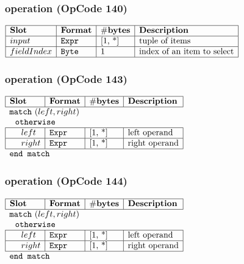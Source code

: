 \subsubsection{ operation (OpCode 140)}

\noindent
\(\begin{array}{| l | l | l | l |}
    \hline
    \bf{Slot} & \bf{Format} & \bf{\#bytes} & \bf{Description} \\
    \hline
         input & \lst{Expr} & \text{[1, *]} & \text{tuple of items} \\
    \hline
           fieldIndex & \lst{Byte} & \text{1} & \text{index of an item to select} \\
    \hline
      
\end{array}\)
       

\subsubsection{ operation (OpCode 143)}

\noindent
\(\begin{array}{| l | l | l | l |}
    \hline
    \bf{Slot} & \bf{Format} & \bf{\#bytes} & \bf{Description} \\
    \hline
        \multicolumn{4}{l}{\lst{match}~(left, right)} \\
         
    \multicolumn{4}{l}{~~\lst{otherwise} } \\
    \hline
            ~~~~ left & \lst{Expr} & \text{[1, *]} & \text{left operand} \\
    \hline
          ~~~~ right & \lst{Expr} & \text{[1, *]} & \text{right operand} \\
    \hline
          \multicolumn{4}{l}{\lst{end match}} \\
\end{array}\)
       

\subsubsection{ operation (OpCode 144)}

\noindent
\(\begin{array}{| l | l | l | l |}
    \hline
    \bf{Slot} & \bf{Format} & \bf{\#bytes} & \bf{Description} \\
    \hline
        \multicolumn{4}{l}{\lst{match}~(left, right)} \\
         
    \multicolumn{4}{l}{~~\lst{otherwise} } \\
    \hline
            ~~~~ left & \lst{Expr} & \text{[1, *]} & \text{left operand} \\
    \hline
          ~~~~ right & \lst{Expr} & \text{[1, *]} & \text{right operand} \\
    \hline
          \multicolumn{4}{l}{\lst{end match}} \\
\end{array}\)
       

